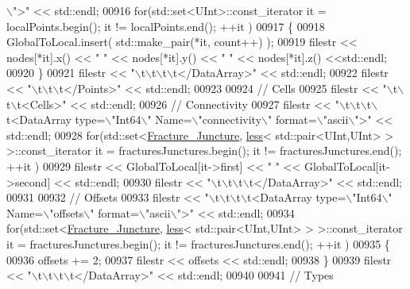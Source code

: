 \begin{DoxyCode}
{      \(\backslash\)">"} << std::endl;
00916     \textcolor{keywordflow}{for}(std::set<UInt>::const\_iterator it = localPoints.begin(); it != localPoints.end(); ++it )
00917     \{
00918         GlobalToLocal.insert( std::make\_pair(*it, count++) );
00919         filestr << nodes[*it].x() << \textcolor{stringliteral}{" "} << nodes[*it].y() << \textcolor{stringliteral}{" "} << nodes[*it].z() <<std::endl;
00920     \}
00921     filestr << \textcolor{stringliteral}{"\(\backslash\)t\(\backslash\)t\(\backslash\)t\(\backslash\)t</DataArray>"} << std::endl;
00922     filestr << \textcolor{stringliteral}{"\(\backslash\)t\(\backslash\)t\(\backslash\)t</Points>"} << std::endl;
00923 
00924     \textcolor{comment}{// Cells}
00925     filestr << \textcolor{stringliteral}{"\(\backslash\)t\(\backslash\)t\(\backslash\)t<Cells>"} << std::endl;
00926     \textcolor{comment}{//  Connectivity}
00927     filestr << \textcolor{stringliteral}{"\(\backslash\)t\(\backslash\)t\(\backslash\)t\(\backslash\)t<DataArray type=\(\backslash\)"Int64\(\backslash\)" Name=\(\backslash\)"connectivity\(\backslash\)" format=\(\backslash\)"ascii\(\backslash\)">"} << std::endl;
00928     \textcolor{keywordflow}{for}(std::set<\hyperlink{classFVCode3D_1_1Exporter_a30344139bcff116e4b2b34dd829bac98}{Fracture\_Juncture}, \hyperlink{structFVCode3D_1_1less}{less}< std::pair<UInt,UInt> > >::const\_iterator it 
      = fracturesJunctures.begin(); it != fracturesJunctures.end(); ++it )
00929         filestr << GlobalToLocal[it->first] << \textcolor{stringliteral}{" "} << GlobalToLocal[it->second] << std::endl;
00930     filestr << \textcolor{stringliteral}{"\(\backslash\)t\(\backslash\)t\(\backslash\)t\(\backslash\)t</DataArray>"} << std::endl;
00931 
00932     \textcolor{comment}{//  Offsets}
00933     filestr << \textcolor{stringliteral}{"\(\backslash\)t\(\backslash\)t\(\backslash\)t\(\backslash\)t<DataArray type=\(\backslash\)"Int64\(\backslash\)" Name=\(\backslash\)"offsets\(\backslash\)" format=\(\backslash\)"ascii\(\backslash\)">"} << std::endl;
00934     \textcolor{keywordflow}{for}(std::set<\hyperlink{classFVCode3D_1_1Exporter_a30344139bcff116e4b2b34dd829bac98}{Fracture\_Juncture}, \hyperlink{structFVCode3D_1_1less}{less}< std::pair<UInt,UInt> > >::const\_iterator it 
      = fracturesJunctures.begin(); it != fracturesJunctures.end(); ++it )
00935     \{
00936         offsets += 2;
00937         filestr << offsets << std::endl;
00938     \}
00939     filestr << \textcolor{stringliteral}{"\(\backslash\)t\(\backslash\)t\(\backslash\)t\(\backslash\)t</DataArray>"} << std::endl;
00940 
00941     \textcolor{comment}{//  Types}

\end{DoxyCode}
